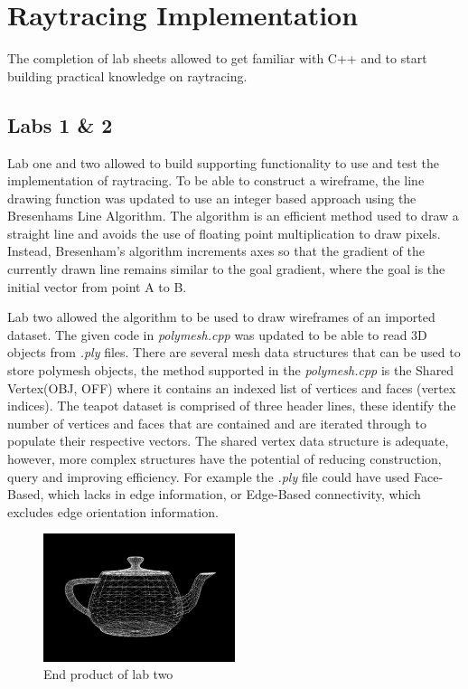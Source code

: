 \documentclass{article}
\begin{document}
\section{Raytracing Implementation}
The completion of lab sheets allowed to get familiar with C++ and to start building practical knowledge on raytracing. 

\subsection{Labs 1 \& 2}
Lab one and two allowed to build supporting functionality to use and test the implementation of raytracing. To be able to construct a wireframe, the line drawing function was updated to use an integer based approach using the Bresenhams Line Algorithm. The algorithm is an efficient method used to draw a straight line and avoids the use of floating point multiplication to draw pixels. Instead, Bresenham's algorithm increments axes so that the gradient of the currently drawn line remains similar to the goal gradient, where the goal is the initial vector from point A to B.

Lab two allowed the algorithm to be used to draw wireframes of an imported dataset. The given code in \textit{polymesh.cpp} was updated to be able to read 3D objects from \textit{.ply} files. There are several mesh data structures that can be used to store polymesh objects, the method supported in the \textit{polymesh.cpp} is the Shared Vertex(OBJ, OFF) where it contains an indexed list of vertices and faces (vertex indices). The teapot dataset is comprised of three header lines, these identify the number of vertices and faces that are contained and are iterated through to populate their respective vectors. The shared vertex data structure is adequate, however, more complex structures have the potential of reducing construction, query and improving efficiency. For example the \textit{.ply} file could have used Face-Based, which lacks in edge information, or Edge-Based connectivity, which excludes edge orientation information.

\begin{figure}[h]
\centering
\includegraphics[width=0.5\textwidth]{wireframe}
\captionsetup{justification=centering,margin=0.5cm}
\caption{End product of lab two}
\label{fig:wireframe}
\end{figure}
\end{document}
